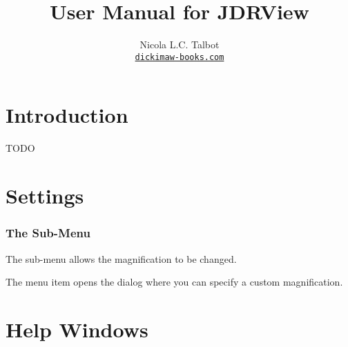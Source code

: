 
\usepackage{fontspec}
\setmainfont{Linux Libertine O}
\usepackage{verbatim}
\usepackage
 [
    novref,
 ]{texjavahelp}

\hypersetup{colorlinks,linkcolor=blue}

\newcommand{\JDRView}{JDRView}

\title{User Manual for \JDRView}
\author{Nicola L.C. Talbot\\\href{https://www.dickimaw-books.com/}{\nolinkurl{dickimaw-books.com}}}


\GlsXtrLoadResources[src={jdrview,shared,\langbibsrcs},
 \TeXJavaHelpSymbolResourceOptions
]

\GlsXtrLoadResources[src={jdrview,shared,\langbibsrcs},
 \TeXJavaHelpGlsResourceOptions
]


\maketitle
\frontmatter
\tableofcontents
\listoffigures

\chapter{Introduction}
\label{sec:intro}

TODO

\chapter{Settings}
\label{sec:settings}

\subsection{The  Sub-Menu}
\label{sec:zoommenu}


The  sub-menu allows the magnification to
be changed.


The  menu item opens the
 dialog where you can specify a custom
magnification.

\chapter{Help Windows}
\label{sec:helpwindows}

